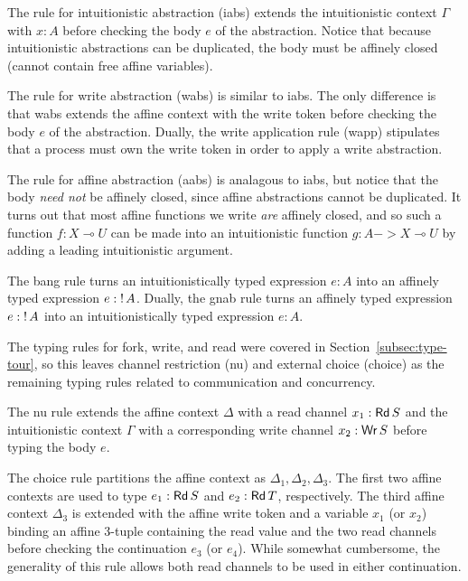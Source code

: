 The rule for intuitionistic abstraction (iabs) extends the intuitionistic
context $\Gamma$ with $x : A$ before checking the body $e$ of the abstraction. Notice
that because intuitionistic abstractions can be duplicated, the body must be
affinely closed (cannot contain free affine variables).

The rule for write abstraction (wabs) is similar to iabs. The only difference is
that wabs extends the affine context with the write token before checking the
body $e$ of the abstraction. Dually, the write application rule (wapp)
stipulates that a process must own the write token in order to apply a write
abstraction.

The rule for affine abstraction (aabs) is analagous to iabs, but notice that the
body \emph{need not} be affinely closed, since affine abstractions cannot be
duplicated. It turns out that most affine functions we write \emph{are} affinely
closed, and so such a function $f : X \multimap U$ can be made into an intuitionistic
function $g : A -> X \multimap U$ by adding a leading intuitionistic argument.

The bang rule turns an intuitionistically typed expression $e:A$ into an
affinely typed expression $e:{!}\,{A}$. Dually, the gnab rule turns an
affinely typed expression $e:{!}\,{A}$ into an intuitionistically typed
expression $e:A$.

The typing rules for fork, write, and read were covered in
Section~\ref{subsec:type-tour}, so this leaves channel restriction (nu) and
external choice (choice) as the remaining typing rules related to communication
and concurrency.

The nu rule extends the affine context $\Delta$ with a read channel $x_1 : \textnormal{\textsf{Rd}}\,S$
and the intuitionistic context $\Gamma$ with a corresponding write channel $x_2
: \textnormal{\textsf{Wr}}\,S$ before typing the body $e$.

The choice rule partitions the affine context as $\Delta_1,\Delta_2,\Delta_3$. The first two
affine contexts are used to type $e_1 : \textnormal{\textsf{Rd}}\,S$ and $e_2 : \textnormal{\textsf{Rd}}\,T$,
respectively. The third affine context $\Delta_3$ is extended with the affine write
token and a variable $x_1$ (or $x_2$) binding an affine 3-tuple containing the
read value and the two read channels before checking the continuation $e_3$ (or
$e_4$). While somewhat cumbersome, the generality of this rule allows both read
channels to be used in either continuation.


